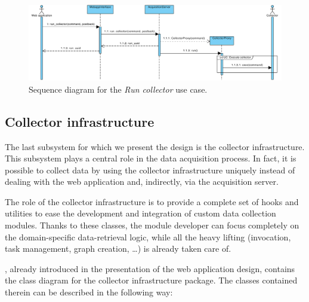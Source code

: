 \begin{figure}
  \begin{adjustwidth}{-7.5mm}{-1.5cm}
    \includegraphics[width=\linewidth]{images/diagrams/seq-run-collector}
  \end{adjustwidth}
  \caption{Sequence diagram for the \emph{Run collector} use case.}
  \label{fig:seq-run-collector}
\end{figure}


\subsection{Collector infrastructure}

The last subsystem for which we present the design is the collector infrastructure. This subsystem plays a central role in the data acquisition process. In fact, it is possible to collect data by using the collector infrastructure uniquely instead of dealing with the web application and, indirectly, via the acquisition server.

The role of the collector infrastructure is to provide a complete set of hooks and utilities to ease the development and integration of custom data collection modules. Thanks to these classes, the module developer can focus completely on the domain-specific data-retrieval logic, while all the heavy lifting (invocation, task management, graph creation, \ldots) is already taken care of.

, already introduced in the presentation of the web application design, contains the class diagram for the collector infrastructure package. The classes contained therein can be described in the following way:


